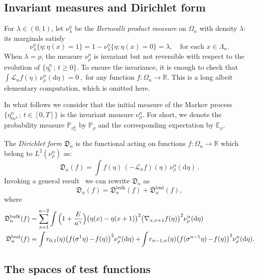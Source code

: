\documentclass[AHL,Unicode,longabstracts]{cedram}
\DeclareMathOperator{\bulk}{bulk}
\DeclareMathOperator{\bnd}{bnd}
\newcommand{\bb}[1]{{\mathbb #1}}
\newcommand{\mc}[1]{{\mathcal #1}}
\newcommand{\mf}[1]{{\mathfrak #1}}
\renewcommand{\mc}[1]{{\mathcal #1}}
\renewcommand{\geq}{\geqslant}
\newcommand*{\dd}{\mathrm{d}}
\newcommand*{\mk}{\mkern -1mu}
\newcommand*{\Mk}{\mkern -2mu}
\begin{document}
\subsection{Invariant measures and Dirichlet form}

For $\lambda \in (0,1)$, let $\nu^n_\lambda$ be the \emph{Bernoulli product measure} on $\Omega_n$ with density $\lambda$: its marginals satisfy
\[
\nu^n_\lambda\big\{\eta: \eta(x)=1\big\} = 1-\nu^n_\lambda\big\{\eta:\eta(x)=0\big\} =\lambda, \quad \text {for each } x\in \Lambda_n.
\]
When $\lambda=\rho$, the measure $\nu^n_\rho$ is invariant but not reversible with respect to the evolution of $\{\eta_t^n\,; \,t \geq 0\}$. To ensure the invariance, it is enough to check that $
\int \mathcal L_n f(\eta)\, \nu^n_\rho(\dd\eta) =0\,,$ for any function $f:\Omega_n\to \bb R$. This is a long albeit elementary computation, which is omitted here.

In what follows we consider that the initial measure of the Markov process $\{\eta^n_{tn^2}\,; \, t\in [0,T]\}$ is the invariant measure $\nu^n_\rho$. For short, we denote the probability measure $\bb P_{\nu^n_\rho}$ by $\bb P_\rho$ and the corresponding expectation by $\bb E_\rho$.


The \emph{Dirichlet form} $\mf D_n$ is the functional acting on functions $f:\Omega_n\to \bb R$ which belong to $L^2(\nu^n_\rho)$ as:
\begin{equation}\label{eq:dir_form}
\mf D_n(f) =\int f(\eta)\,(-\mc L_nf)(\eta)\, \nu^n_\rho(\dd\eta)\,.
\end{equation}
Invoking a general result~\cite[Appendix~1, Proposition~10.1]{kl} we can rewrite $\mf D_n$ as
\begin{equation}
\mf D_n (f)=\mf D_n^{\bulk} (f)+\mf D_n^{{\bnd}} (f),\label{eq:direxpl}
\end{equation}
where
\begin{align*}
\mf D_n^{\bulk} (f)&=\sum_{x=1}^{n-2}\int \Big(1+\frac{E}{n^\gamma} \Big){\big(\eta(x)-\eta(x+1)\big)^2}\big(\nabla_{x,x+1} f(\eta)\big)^2\nu^n_\rho(\dd\eta)\\
\mf D_n^{\bnd} (f)&=
\int\mk r_{0,1}(\eta)\big(f(\sigma^{1}\eta) \mk-\!f(\eta)\big)^2\nu^n_\rho(\dd\eta) +\Mk
\int\mk r_{n-1,n}(\eta)\big(f(\sigma^{n-1}\eta) \mk-\!f(\eta)\big)^2\nu^n_\rho(\dd\eta).
\end{align*}


\subsection{The spaces of test functions}\label{ssec:test_functions}
\end{document}
